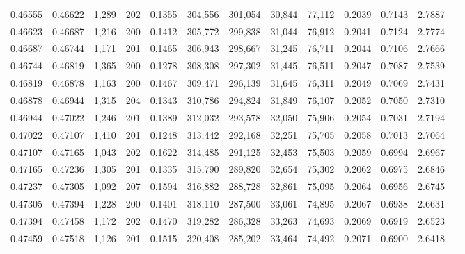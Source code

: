 \begin{tabular}{rrrrrrrrrrrrr}
0.46555 & 0.46622 & 1,289 & 202 &                                     0.1355 & 304,556 & 301,054 &  30,844 &  77,112 & 0.2039 & 0.7143 & 2.7887 \\
0.46623 & 0.46687 & 1,216 & 200 &                                     0.1412 & 305,772 & 299,838 &  31,044 &  76,912 & 0.2041 & 0.7124 & 2.7774 \\
0.46687 & 0.46744 & 1,171 & 201 &                                     0.1465 & 306,943 & 298,667 &  31,245 &  76,711 & 0.2044 & 0.7106 & 2.7666 \\
0.46744 & 0.46819 & 1,365 & 200 &                                     0.1278 & 308,308 & 297,302 &  31,445 &  76,511 & 0.2047 & 0.7087 & 2.7539 \\
0.46819 & 0.46878 & 1,163 & 200 &                                     0.1467 & 309,471 & 296,139 &  31,645 &  76,311 & 0.2049 & 0.7069 & 2.7431 \\
0.46878 & 0.46944 & 1,315 & 204 &                                     0.1343 & 310,786 & 294,824 &  31,849 &  76,107 & 0.2052 & 0.7050 & 2.7310 \\
0.46944 & 0.47022 & 1,246 & 201 &                                     0.1389 & 312,032 & 293,578 &  32,050 &  75,906 & 0.2054 & 0.7031 & 2.7194 \\
0.47022 & 0.47107 & 1,410 & 201 &                                     0.1248 & 313,442 & 292,168 &  32,251 &  75,705 & 0.2058 & 0.7013 & 2.7064 \\
0.47107 & 0.47165 & 1,043 & 202 &                                     0.1622 & 314,485 & 291,125 &  32,453 &  75,503 & 0.2059 & 0.6994 & 2.6967 \\
0.47165 & 0.47236 & 1,305 & 201 &                                     0.1335 & 315,790 & 289,820 &  32,654 &  75,302 & 0.2062 & 0.6975 & 2.6846 \\
0.47237 & 0.47305 & 1,092 & 207 &                                     0.1594 & 316,882 & 288,728 &  32,861 &  75,095 & 0.2064 & 0.6956 & 2.6745 \\
0.47305 & 0.47394 & 1,228 & 200 &                                     0.1401 & 318,110 & 287,500 &  33,061 &  74,895 & 0.2067 & 0.6938 & 2.6631 \\
0.47394 & 0.47458 & 1,172 & 202 &                                     0.1470 & 319,282 & 286,328 &  33,263 &  74,693 & 0.2069 & 0.6919 & 2.6523 \\
0.47459 & 0.47518 & 1,126 & 201 &                                     0.1515 & 320,408 & 285,202 &  33,464 &  74,492 & 0.2071 & 0.6900 & 2.6418 \\

\end{tabular}

